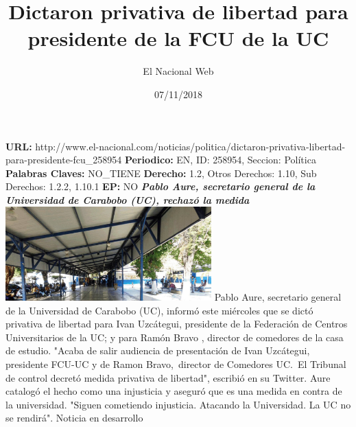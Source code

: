 \documentclass{article}%
\title{\textbf{Dictaron privativa de libertad para presidente de la FCU de la UC}}%
\author{El Nacional Web}%
\date{07/11/2018}%
\begin{document}
%
\normalsize%
\maketitle%
\textbf{URL: }%
http://www.el{-}nacional.com/noticias/politica/dictaron{-}privativa{-}libertad{-}para{-}presidente{-}fcu\_258954\newline%
%
\textbf{Periodico: }%
EN, %
ID: %
258954, %
Seccion: %
Política\newline%
%
\textbf{Palabras Claves: }%
NO\_TIENE\newline%
%
\textbf{Derecho: }%
1.2, %
Otros Derechos: %
1.10, %
Sub Derechos: %
1.2.2, 1.10.1\newline%
%
\textbf{EP: }%
NO\newline%
\newline%
%
\textbf{\textit{Pablo Aure, secretario general de la Universidad de Carabobo (UC), rechazó la medida}}%
\newline%
\newline%
%
\includegraphics[width=300px]{36.jpg}%
\newline%
%
Pablo Aure, secretario general de la Universidad de Carabobo (UC), informó este miércoles que se dictó privativa de libertad para Ivan Uzcátegui, presidente de la Federación de Centros Universitarios de la UC; y para Ramón Bravo , director de comedores de la casa de estudio.%
\newline%
%
"Acaba de salir audiencia de presentación de Ivan Uzcátegui, presidente FCU{-}UC y de Ramon Bravo,~director de Comedores UC.~El Tribunal de control decretó medida privativa de libertad", escribió en su Twitter.%
\newline%
%
Aure catalogó el hecho como una injusticia y aseguró que es una medida en contra de la universidad. "Siguen cometiendo injusticia. Atacando la Universidad. La UC no se rendirá".%
\newline%
%
Noticia en desarrollo%
\newline%
%
\end{document}
